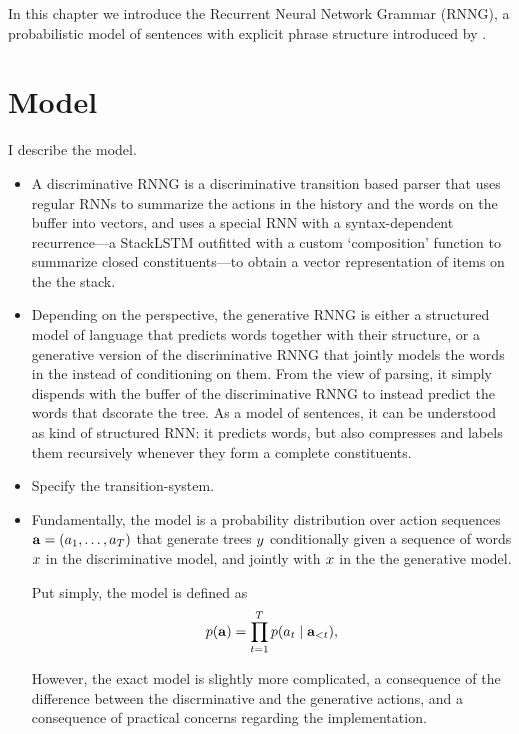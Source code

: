 % 

In this chapter we introduce the Recurrent Neural Network Grammar (RNNG), a probabilistic model of sentences with explicit phrase structure introduced by \citep{dyer2016rnng}.

\section{Model}
I describe the model.
\begin{itemize}
  \item A discriminative RNNG is a discriminative transition based parser that uses regular RNNs to summarize the actions in the history and the words on the buffer into vectors, and uses a special RNN with a syntax-dependent recurrence---a StackLSTM \citep{ballesteros2017greedy} outfitted with a custom `composition' function to summarize closed constituents---to obtain a vector representation of items on the the stack.
  \item Depending on the perspective, the generative RNNG is either a structured model of language that predicts words together with their structure, or a generative version of the discriminative RNNG that jointly models the words in the instead of conditioning on them. From the view of parsing, it simply dispends with the buffer of the discriminative RNNG to instead predict the words that dscorate the tree. As a model of sentences, it can be understood as kind of structured RNN: it predicts words, but also compresses and labels them recursively whenever they form a complete constituents.
  \item Specify the transition-system.
  \item Fundamentally, the model is a probability distribution over action sequences $\mathbf{a} = ( a_1, \dots, a_T )$ that generate trees $y$ conditionally given a sequence of words $x$ in the discriminative model, and jointly with $x$ in the the generative model.

  Put simply, the model is defined as
  \begin{equation}
    \label{eq:naive-rnng-model}
    p(\mathbf{a}) = \prod_{t=1}^T p(a_t \mid \mathbf{a}_{<t}),
  \end{equation}

  However, the exact model is slightly more complicated, a consequence of the difference between the discrminative and the generative actions, and a consequence of practical concerns regarding the implementation.


\end{itemize}
